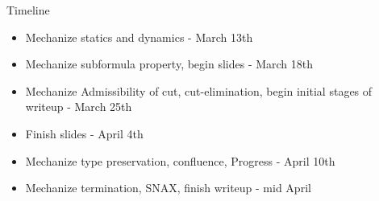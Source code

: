 \documentclass[9ps]{beamer}
\begin{document}
\begin{frame}{Timeline}
  \begin{itemize}
    \item Mechanize statics and dynamics - March 13th
    \item Mechanize subformula property, begin slides - March 18th
    \item Mechanize Admissibility of cut, cut-elimination, begin initial stages of writeup - March 25th
    \item Finish slides - April 4th
    \item Mechanize type preservation, confluence, Progress - April 10th
    \item Mechanize termination, SNAX, finish writeup - mid April
  \end{itemize} 
\end{frame}



\end{document}
